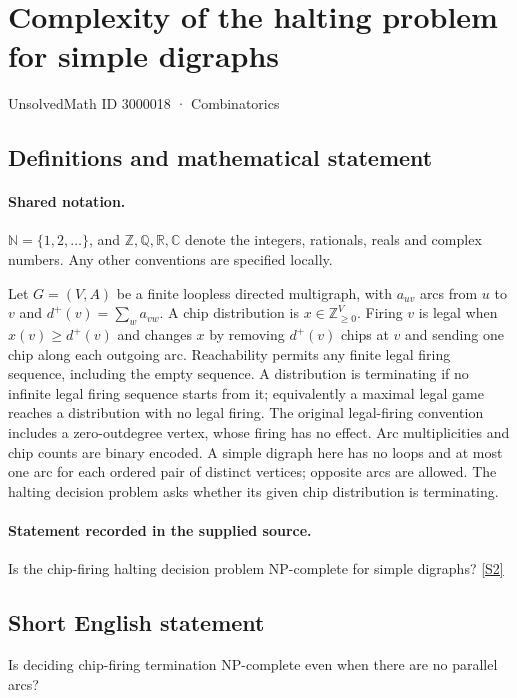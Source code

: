 \documentclass[11pt]{article}
\newcommand{\sref}[2]{\hyperlink{source:#1:#2}{[S#2]}}
\begin{document}
\setcounter{section}{3000017}
\section{Complexity of the halting problem for simple digraphs}\label{3000018}
{\small\sffamily UnsolvedMath ID 3000018 · Combinatorics}
\subsection{Definitions and mathematical statement}

\paragraph{Shared notation.}$\mathbb N=\{1,2,\ldots\}$, and $\mathbb Z,\mathbb Q,\mathbb R,\mathbb C$ denote the integers, rationals, reals and complex numbers. Any other conventions are specified locally.


Let $G=(V,A)$ be a finite loopless directed multigraph, with $a_{uv}$ arcs from $u$ to $v$ and $d^+(v)=\sum_w a_{vw}$. A chip distribution is $x\in\mathbb Z_{\ge0}^{V}$. Firing $v$ is legal when $x(v)\ge d^+(v)$ and changes $x$ by removing $d^+(v)$ chips at $v$ and sending one chip along each outgoing arc. Reachability permits any finite legal firing sequence, including the empty sequence. A distribution is terminating if no infinite legal firing sequence starts from it; equivalently a maximal legal game reaches a distribution with no legal firing. The original legal-firing convention includes a zero-outdegree vertex, whose firing has no effect. Arc multiplicities and chip counts are binary encoded. A simple digraph here has no loops and at most one arc for each ordered pair of distinct vertices; opposite arcs are allowed. The halting decision problem asks whether its given chip distribution is terminating.
\paragraph{Statement recorded in the supplied source.}
Is the chip-firing halting decision problem NP-complete for simple digraphs? \sref{3000018}{2}
\subsection{Short English statement}
Is deciding chip-firing termination NP-complete even when there are no parallel arcs?
\end{document}
